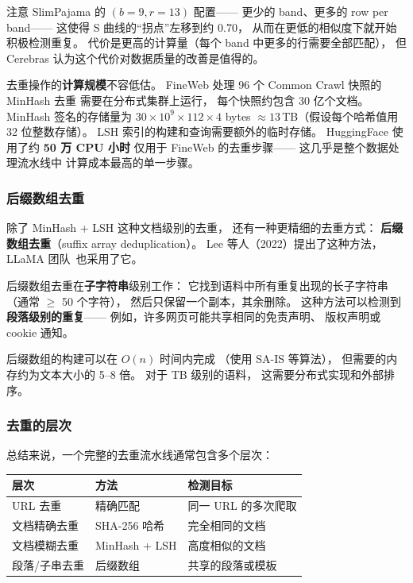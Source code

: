注意 SlimPajama 的 $(b=9, r=13)$ 配置——
更少的 band、更多的 row per band——
这使得 S 曲线的``拐点''左移到约 0.70，
从而在更低的相似度下就开始积极检测重复。
代价是更高的计算量（每个 band 中更多的行需要全部匹配），
但 Cerebras 认为这个代价对数据质量的改善是值得的。

去重操作的\textbf{计算规模}不容低估。
FineWeb 处理 96 个 Common Crawl 快照的 MinHash 去重
需要在分布式集群上运行，
每个快照约包含 30 亿个文档。
MinHash 签名的存储量为 $30 \times 10^9 \times 112 \times 4$ bytes
$\approx 13$\,TB（假设每个哈希值用 32 位整数存储）。
LSH 索引的构建和查询需要额外的临时存储。
HuggingFace 使用了约 \textbf{50 万 CPU 小时}
仅用于 FineWeb 的去重步骤——
这几乎是整个数据处理流水线中
计算成本最高的单一步骤。

\subsubsection{后缀数组去重}

除了 MinHash + LSH 这种文档级别的去重，
还有一种更精细的去重方式：
\textbf{后缀数组去重}（suffix array deduplication）。
Lee 等人（2022）提出了这种方法，
LLaMA 团队~\cite{touvron2023llama}也采用了它。

后缀数组去重在\textbf{子字符串}级别工作：
它找到语料中所有重复出现的长子字符串
（通常 $\geq$ 50 个字符），
然后只保留一个副本，其余删除。
这种方法可以检测到
\textbf{段落级别的重复}——
例如，许多网页可能共享相同的免责声明、
版权声明或 cookie 通知。

后缀数组的构建可以在 $O(n)$ 时间内完成
（使用 SA-IS 等算法），
但需要的内存约为文本大小的 5--8 倍。
对于 TB 级别的语料，
这需要分布式实现和外部排序。

\subsubsection{去重的层次}

总结来说，一个完整的去重流水线通常包含多个层次：

\begin{center}
\small
\begin{tabular}{lll}
\hline
\textbf{层次} & \textbf{方法} & \textbf{检测目标} \\
\hline
URL 去重       & 精确匹配         & 同一 URL 的多次爬取 \\
文档精确去重   & SHA-256 哈希     & 完全相同的文档 \\
文档模糊去重   & MinHash + LSH    & 高度相似的文档 \\
段落/子串去重  & 后缀数组         & 共享的段落或模板 \\
\hline
\end{tabular}
\end{center}

